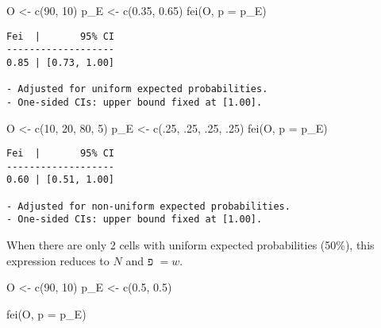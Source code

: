 \documentclass[mathematics,article,submit,moreauthors,pdftex]{mdpi}
\newenvironment{Shaded}{\begin{snugshade}}{\end{snugshade}}
\newcommand{\AttributeTok}[1]{\textcolor[rgb]{0.77,0.63,0.00}{#1}}
\newcommand{\DecValTok}[1]{\textcolor[rgb]{0.00,0.00,0.81}{#1}}
\newcommand{\FloatTok}[1]{\textcolor[rgb]{0.00,0.00,0.81}{#1}}
\newcommand{\FunctionTok}[1]{\textcolor[rgb]{0.00,0.00,0.00}{#1}}
\newcommand{\NormalTok}[1]{#1}
\newcommand{\OtherTok}[1]{\textcolor[rgb]{0.56,0.35,0.01}{#1}}
\begin{document}
\begin{Shaded}
\begin{Highlighting}[]
\NormalTok{O }\OtherTok{\textless{}{-}} \FunctionTok{c}\NormalTok{(}\DecValTok{90}\NormalTok{, }\DecValTok{10}\NormalTok{)}
\NormalTok{p\_E }\OtherTok{\textless{}{-}} \FunctionTok{c}\NormalTok{(}\FloatTok{0.35}\NormalTok{, }\FloatTok{0.65}\NormalTok{)}
\FunctionTok{fei}\NormalTok{(O, }\AttributeTok{p =}\NormalTok{ p\_E)}
\end{Highlighting}
\end{Shaded}

\begin{verbatim}
Fei  |       95% CI
-------------------
0.85 | [0.73, 1.00]

- Adjusted for uniform expected probabilities.
- One-sided CIs: upper bound fixed at [1.00].
\end{verbatim}

\begin{Shaded}
\begin{Highlighting}[]
\NormalTok{O }\OtherTok{\textless{}{-}} \FunctionTok{c}\NormalTok{(}\DecValTok{10}\NormalTok{, }\DecValTok{20}\NormalTok{, }\DecValTok{80}\NormalTok{, }\DecValTok{5}\NormalTok{)}
\NormalTok{p\_E }\OtherTok{\textless{}{-}} \FunctionTok{c}\NormalTok{(.}\DecValTok{25}\NormalTok{, .}\DecValTok{25}\NormalTok{, .}\DecValTok{25}\NormalTok{, .}\DecValTok{25}\NormalTok{)}
\FunctionTok{fei}\NormalTok{(O, }\AttributeTok{p =}\NormalTok{ p\_E)}
\end{Highlighting}
\end{Shaded}

\begin{verbatim}
Fei  |       95% CI
-------------------
0.60 | [0.51, 1.00]

- Adjusted for non-uniform expected probabilities.
- One-sided CIs: upper bound fixed at [1.00].
\end{verbatim}

When there are only 2 cells with uniform expected probabilities (50\%),
this expression reduces to \(N\) and פ \(= w\).

\begin{Shaded}
\begin{Highlighting}[]
\NormalTok{O }\OtherTok{\textless{}{-}} \FunctionTok{c}\NormalTok{(}\DecValTok{90}\NormalTok{, }\DecValTok{10}\NormalTok{)}
\NormalTok{p\_E }\OtherTok{\textless{}{-}} \FunctionTok{c}\NormalTok{(}\FloatTok{0.5}\NormalTok{, }\FloatTok{0.5}\NormalTok{)}

\FunctionTok{fei}\NormalTok{(O, }\AttributeTok{p =}\NormalTok{ p\_E)}
\end{Highlighting}
\end{Shaded}
\end{document}
